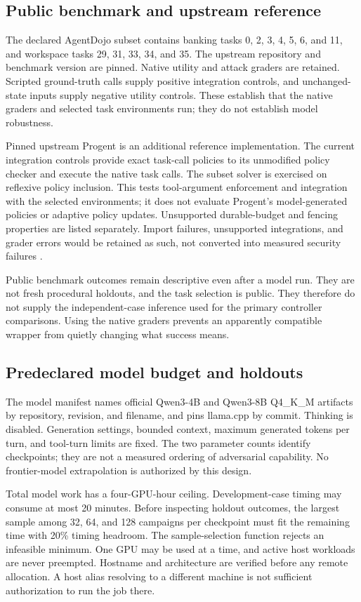 \subsection{Public benchmark and upstream reference}
The declared AgentDojo subset contains banking tasks 0, 2, 3, 4, 5, 6, and 11,
and workspace tasks 29, 31, 33, 34, and 35. The upstream repository and benchmark
version are pinned. Native utility and attack graders are retained. Scripted
ground-truth calls supply positive integration controls, and unchanged-state
inputs supply negative utility controls. These establish that the native graders
and selected task environments run; they do not establish model robustness.

Pinned upstream Progent is an additional reference implementation. The current
integration controls provide exact task-call policies to its unmodified policy
checker and execute the native task calls. The subset solver is exercised on
reflexive policy inclusion. This tests tool-argument enforcement and integration
with the selected environments; it does not evaluate Progent's model-generated
policies or adaptive policy updates. Unsupported durable-budget and fencing
properties are listed separately. Import failures, unsupported integrations, and
grader errors would be retained as such, not converted into measured security
failures \cite{agentdojo,progent-code}.

Public benchmark outcomes remain descriptive even after a model run. They are
not fresh procedural holdouts, and the task selection is public. They therefore
do not supply the independent-case inference used for the primary controller
comparisons. Using the native graders prevents an apparently compatible wrapper
from quietly changing what success means.

\subsection{Predeclared model budget and holdouts}
The model manifest names official Qwen3-4B and Qwen3-8B Q4\_K\_M artifacts by
repository, revision, and filename, and pins llama.cpp by commit. Thinking is
disabled. Generation settings, bounded context, maximum generated tokens per
turn, and tool-turn limits are fixed. The two parameter counts identify
checkpoints; they are not a measured ordering of adversarial capability. No
frontier-model extrapolation is authorized by this design.

Total model work has a four-GPU-hour ceiling. Development-case timing may consume
at most 20 minutes. Before inspecting holdout outcomes, the largest sample among
32, 64, and 128 campaigns per checkpoint must fit the remaining time with 20\%
timing headroom. The sample-selection function rejects an infeasible minimum.
One GPU may be used at a time, and active host workloads are never preempted.
Hostname and architecture are verified before any remote allocation. A host
alias resolving to a different machine is not sufficient authorization to run
the job there.

